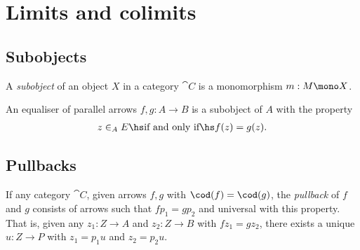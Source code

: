 \documentclass{article}
\begin{document}
\section{Limits and colimits}

\subsection{Subobjects}

\begin{definition}[Awodey p. 89]
    A \emph{subobject} of an object $X$ in a category $\cat C$ is 
    a monomorphism $m:M\mono X$.
\end{definition}

\begin{corollary}
    An equaliser of parallel arrows $f,g:A\to B$ is a subobject
    of $A$ with the property
    \begin{align*}
        z\in_A E \hs\text{if and only if}\hs f(z) = g(z).
    \end{align*}
\end{corollary}

\subsection{Pullbacks}

\begin{definition}[Awodey p. 92]
    If any category $\cat C$, given arrows $f,g$ with $\cod(f)=\cod(g)$, 
    the \emph{pullback} of $f$ and $g$ consists of arrows such that $fp_1=gp_2$
    and universal with this property. That is, given any $z_1:Z\to A$ and
    $z_2:Z\to B$ with $fz_1=gz_2$, there exists a unique $u:Z\to P$ with
    $z_1=p_1u$ and $z_2=p_2u$.
    \begin{center}
    \end{center}
\end{definition}
\end{document}
